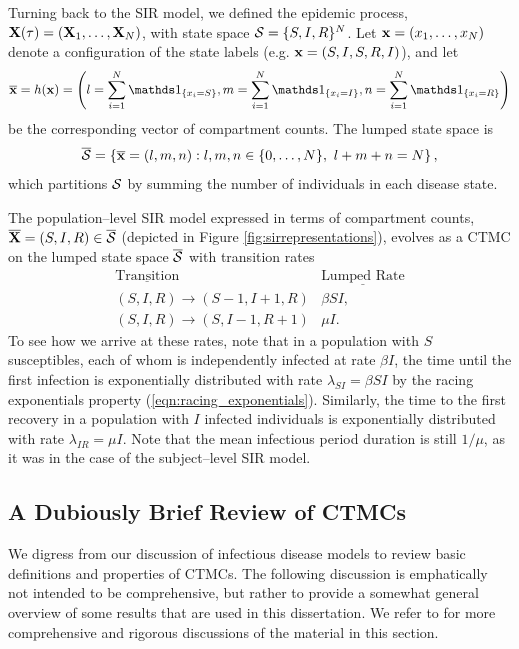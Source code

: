 Turning back to the SIR model, we defined the epidemic process, $ \mathbf{X}(\tau) = (\mathbf{X}_1,\dots,\mathbf{X}_N)$, with state space $ \mathcal{S} = \lbrace S, I, R\rbrace^N $. Let $ \mathbf{x} = (x_1,\dots,x_N) $ denote a configuration of the state labels (e.g. $ \mathbf{x} = (S, I, S, R, I) $), and let $$ \overline{\bx} = h(\bx) = \left (l=\sum_{i=1}^N\ind{x_i = S},m=\sum_{i=1}^N\ind{x_i=I},n = \sum_{i=1}^N\ind{x_i=R}\right ) $$ be the corresponding vector of compartment counts. The lumped state space is 
$$ \overline{\mathcal{S}} = \left \lbrace \overline{\mathbf{x}} = (l,m,n): l,m,n \in \lbrace0,\dots,N\rbrace,\  l+m+n = N \right \rbrace, $$ 
which partitions $ \mathcal{S} $ by summing the number of individuals in each disease state. 

The population--level SIR model expressed in terms of compartment counts, $ \overline{\mathbf{X}} = (S, I, R) \in \overline{\mathcal{S}} $ (depicted in Figure \ref{fig:sirrepresentations}), evolves as a CTMC on the lumped state space $ \overline{\mathcal{S}} $ with transition rates
\begin{equation*}
\begin{array}{cc}
\underline{\text{Transition}} & \underline{\text{Lumped Rate}} \\
(S,I,R) \longrightarrow (S-1,I+1,R) & \beta S I ,\\
(S,I,R) \longrightarrow (S,I-1,R+1) & \mu I .
\end{array}
\end{equation*}
To see how we arrive at these rates, note that in a population with $ S $ susceptibles, each of whom is independently infected at rate $ \beta I $, the time until the first infection is exponentially distributed with rate $ \lambda_{SI} = \beta SI $ by the racing exponentials property (\ref{eqn:racing_exponentials}). Similarly, the time to the first recovery in a population with $ I $ infected individuals is exponentially distributed with rate $\lambda_{IR} = \mu I $. Note that the mean infectious period duration is still $ 1/\mu $, as it was in the case of the subject--level SIR model. 

\subsection{A Dubiously Brief Review of CTMCs}
\label{subsec:ctmc_overview}

We digress from our discussion of infectious disease models to review basic definitions and properties of CTMCs. The following discussion is emphatically not intended to be comprehensive, but rather to provide a somewhat general overview of some results that are used in this dissertation. We refer to \cite{bremaud1999markov,fuchs2013inference,guttorp1995stochastic,wilkinson2011stochastic} for more comprehensive and rigorous discussions of the material in this section. 


